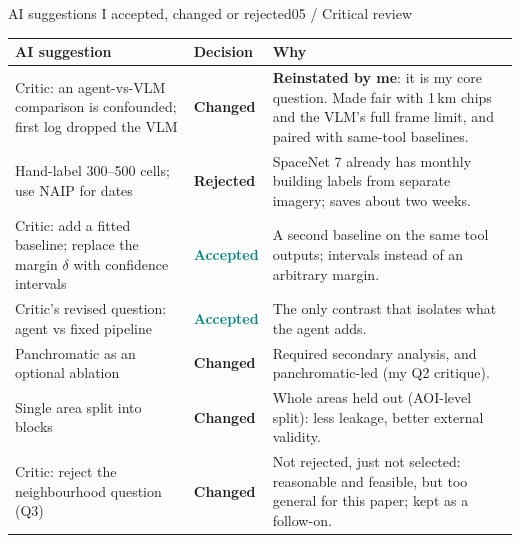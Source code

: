 \documentclass[aspectratio=169,11pt]{beamer}
\newcommand{\acc}{\textcolor{teal}{\textbf{Accepted}}}
\newcommand{\chg}{\textcolor{amber}{\textbf{Changed}}}
\newcommand{\rej}{\textcolor{failred}{\textbf{Rejected}}}
\begin{document}
\begin{frame}[shrink=10]{AI suggestions I accepted, changed or rejected}{05 / Critical review}
\footnotesize
\begin{tabularx}{\textwidth}{@{}p{4.6cm}p{1.6cm}Y@{}}
\toprule
\textbf{AI suggestion} & \textbf{Decision} & \textbf{Why} \\
\midrule
Critic: an agent-vs-VLM comparison is confounded; first log dropped the VLM & \chg & \textbf{Reinstated by me}: it is my core question. Made fair with 1\,km chips and the VLM's full frame limit, and paired with same-tool baselines. \\
Hand-label 300--500 cells; use NAIP for dates & \rej & SpaceNet 7 already has monthly building labels from separate imagery; saves about two weeks. \\
Critic: add a fitted baseline; replace the margin $\delta$ with confidence intervals & \acc & A second baseline on the same tool outputs; intervals instead of an arbitrary margin. \\
Critic's revised question: agent vs fixed pipeline & \acc & The only contrast that isolates what the agent adds. \\
Panchromatic as an optional ablation & \chg & Required secondary analysis, and panchromatic-led (my Q2 critique). \\
Single area split into blocks & \chg & Whole areas held out (AOI-level split): less leakage, better external validity. \\
Critic: reject the neighbourhood question (Q3) & \chg & Not rejected, just not selected: reasonable and feasible, but too general for this paper; kept as a follow-on. \\
\bottomrule
\end{tabularx}
\end{frame}
\end{document}
